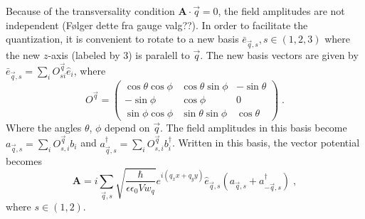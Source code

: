 \documentclass{article}
\begin{document}
Because of the transversality condition $\textbf{A} \cdot \vec{q} = 0$, the field amplitudes are not independent (Følger dette fra gauge valg??). In order to facilitate the quantization, it is convenient to rotate to a new basis $\bar{e}_{\vec{q}, s}, s \in (1,2,3)$ where the new $z$-axis (labeled by $3$) is paralell to $\vec{q}$. The new basis vectors are given by $\bar{e}_{\vec{q}, s} = \sum_i O^{\vec{q}}_{si} \hat{e}_i $, where
\begin{equation}
    O^{\vec{q}} = \begin{pmatrix} 
    \cos{\theta}\cos{\phi} & \cos{\theta}\sin{\phi} & - \sin{\theta} \\ 
    -\sin{\phi}            & \cos{\phi}             & 0 \\
    \sin{\phi}\cos{\phi}   & \sin{\theta}\sin{\phi} & \cos{\theta}
    \end{pmatrix}\;.
\end{equation}
Where the angles $\theta$, $\phi$ depend on $\vec{q}$. The field amplitudes in this basis become $a_{\vec{q},s} = \sum_i O^{\vec{q}}_{s,i} b_i$ and $a_{\vec{q},s}^{\dagger} = \sum_i O^{\vec{q}}_{s,i} b_i^{\dagger}$. Written in this basis, the vector potential becomes
\begin{equation}
    \textbf{A} = i \sum_{\vec{q},s} \sqrt{\frac{\hbar}{\epsilon \epsilon_0 V w_q}} e^{i(q_x x + q_y y )} \hat{e}_{\vec{q},s}\left(a_{\vec{q},s} + a_{-\vec{q}, s}^{\dagger}\right) \;,
    \label{vector potential cavity}
\end{equation}
where $s \in (1,2)$.
\end{document}
